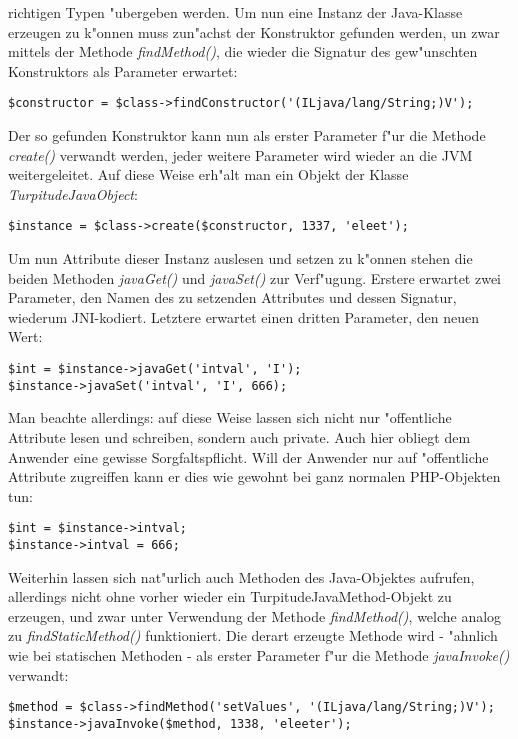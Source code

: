 richtigen Typen "ubergeben werden.
Um nun eine Instanz der Java-Klasse erzeugen zu k"onnen muss zun"achst der Konstruktor
gefunden werden, un zwar mittels der Methode \emph{findMethod()}, die wieder die Signatur
des gew"unschten Konstruktors als Parameter erwartet:
\begin{lstlisting}[caption=Konstruktoren finden]
$constructor = $class->findConstructor('(ILjava/lang/String;)V');
\end{lstlisting}
Der so gefunden Konstruktor kann nun als erster Parameter f"ur die Methode \emph{create()}
verwandt werden, jeder weitere Parameter wird wieder an die JVM weitergeleitet. Auf diese
Weise erh"alt man ein Objekt der Klasse \emph{TurpitudeJavaObject}:
\begin{lstlisting}[caption=Konstruktoren finden]
$instance = $class->create($constructor, 1337, 'eleet');
\end{lstlisting}
Um nun Attribute dieser Instanz auslesen und setzen zu k"onnen stehen die beiden Methoden
\emph{javaGet()} und \emph{javaSet()} zur Verf"ugung. Erstere erwartet zwei Parameter, den
Namen des zu setzenden Attributes und dessen Signatur, wiederum JNI-kodiert. Letztere erwartet
einen dritten Parameter, den neuen Wert:
\begin{lstlisting}[caption=Attribute lesen und schreiben]
$int = $instance->javaGet('intval', 'I');
$instance->javaSet('intval', 'I', 666);
\end{lstlisting}
Man beachte allerdings: auf diese Weise lassen sich nicht nur "offentliche Attribute lesen
und schreiben, sondern auch private. Auch hier obliegt dem Anwender eine gewisse Sorgfaltspflicht.
Will der Anwender nur auf "offentliche Attribute zugreiffen kann er dies wie gewohnt bei ganz
normalen PHP-Objekten tun:
\begin{lstlisting}[caption=Attribute lesen und schreiben]
$int = $instance->intval;
$instance->intval = 666;
\end{lstlisting}
Weiterhin lassen sich nat"urlich auch Methoden des Java-Objektes aufrufen, allerdings nicht ohne
vorher wieder ein TurpitudeJavaMethod-Objekt zu erzeugen, und zwar unter Verwendung der
Methode \emph{findMethod()}, welche analog zu \emph{findStaticMethod()} funktioniert. Die derart
erzeugte Methode wird - "ahnlich wie bei statischen Methoden - als erster Parameter f"ur die
Methode \emph{javaInvoke()} verwandt:
\begin{lstlisting}[caption=Methoden aufrufen]
$method = $class->findMethod('setValues', '(ILjava/lang/String;)V');
$instance->javaInvoke($method, 1338, 'eleeter');
\end{lstlisting}
